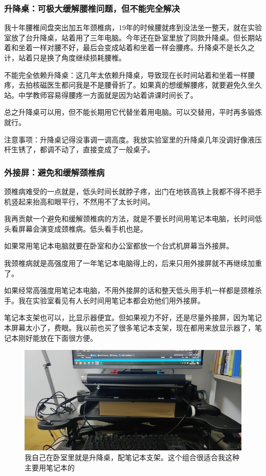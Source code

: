 \subsubsection{升降桌：可极大缓解腰椎问题，但不能完全解决}

我十年腰椎间盘突出加五年颈椎病，19年的时候腰就疼到没法坐一整天，就在实验室放了台升降桌，站着用了三年电脑。今年还在卧室里放了同款升降桌。但长期站着和坐着一样对腰不好，最后会变成站着和坐着一样会腰疼。升降桌不是长久之计，站着只是换了角度继续损耗腰椎。

不能完全依赖升降桌：这几年太依赖升降桌，导致现在长时间站着和坐着一样腰疼，去拍核磁医生都问我是不是腰骨折了。如果真的想缓解腰疼，就要避免久坐久站。中学教师容易得腰疼一方面就是因为站着讲课时间长了。

总之升降桌可以用，但不能长期用它代替坐着用电脑。可以交替用，平时再多锻炼就行。

注意事项：升降桌记得没事调一调高度。我放实验室里的升降桌几年没调好像液压杆生锈了，都调不动了，直接变成了一般桌子。

\subsubsection{外接屏：避免和缓解颈椎病}

颈椎病难受的一点就是，低头时间长就脖子疼，出门在地铁高铁上我都不得不把手机竖起来抬高和眼平行，不然用不了太长时间。

我再贡献一个避免和缓解颈椎病的方法，就是不要长时间用笔记本电脑，长时间低头看屏幕会演变成颈椎病。低头看手机也是。

如果常用笔记本电脑就要在卧室和办公室都放一个台式机屏幕当外接屏。

我颈椎病就是高强度用了一年笔记本电脑得上的，后来只用外接屏就不再继续加重了。

如果经常高强度用笔记本电脑，不用外接屏的话和整天低头用手机一样都是颈椎杀手。我在实验室看见有人长时间用笔记本都会劝他们用外接屏。

笔记本支架也可以，比显示器便宜。但如果视力不好，还是尽量外接屏，因为笔记本屏幕太小了，费眼。我以前也买了很多笔记本支架，现在都用来放显示器了，笔记本刚好能放在下面很方便。

\begin{figure}[H]
    \caption{我自己在卧室里就是升降桌，配笔记本支架。这个组合很适合我这种主要用笔记本的}
    \includegraphics[width=0.95\columnwidth, center]{author-folder/Jialin.Wang/shengjiangzhuo.jpeg}
\end{figure}


